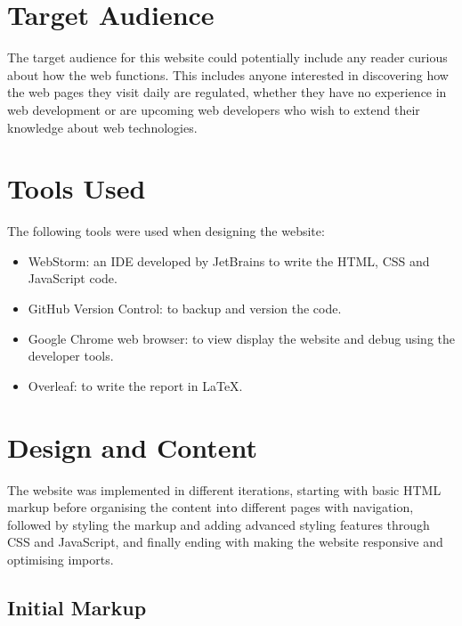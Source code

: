 \documentclass[letterpaper,12pt]{article}
\begin{document}

\section{Target Audience}
\label{sec:target-audience}

The target audience for this website could potentially include any reader curious about how the web functions. This includes anyone interested in discovering how the web pages they visit daily are regulated, whether they have no experience in web development or are upcoming web developers who wish to extend their knowledge about web technologies.


\section{Tools Used}
\label{sec:tools-used}

The following tools were used when designing the website:
\begin{itemize}
    \item WebStorm: an IDE developed by JetBrains \cite{webstorm} to write the HTML, CSS and JavaScript code.
    \item GitHub Version Control: to backup and version the code.
    \item Google Chrome web browser: to view display the website and debug using the developer tools.
    \item Overleaf: to write the report in \LaTeX.
\end{itemize}


\section{Design and Content}
\label{sec:design-content}

The website was implemented in different iterations, starting with basic HTML markup before organising the content into different pages with navigation, followed by styling the markup and adding advanced styling features through CSS and JavaScript, and finally ending with making the website responsive and optimising imports. 

\subsection{Initial Markup}
\label{sec:design-content-initial-markup}
\end{document}
